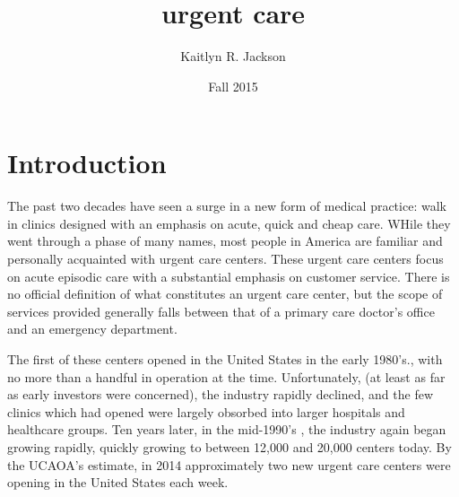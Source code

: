 \documentclass[12pt,twoside]{reedthesis}
\title{urgent care}
\author{Kaitlyn R. Jackson}
\date{Fall 2015}
\begin{document}
      \maketitle
  
  \frontmatter %
  \pagestyle{empty} %

  
  

      \hypersetup{linkcolor=black}
    \setcounter{tocdepth}{2}
    \tableofcontents
  
  
  
  
  
  \mainmatter %
  \pagestyle{fancyplain} %

  \chapter*{Introduction}\label{introduction}
  
  \doublespacing
  
  The past two decades have seen a surge in a new form of medical
  practice: walk in clinics designed with an emphasis on acute, quick and
  cheap care. WHile they went through a phase of many names, most people
  in America are familiar and personally acquainted with urgent care
  centers. These urgent care centers focus on acute episodic care with a
  substantial emphasis on customer service. There is no official
  definition of what constitutes an urgent care center, but the scope of
  services provided generally falls between that of a primary care
  doctor's office and an emergency department.
  
  The first of these centers opened in the United States in the early
  1980's., with no more than a handful in operation at the time.
  Unfortunately, (at least as far as early investors were concerned), the
  industry rapidly declined, and the few clinics which had opened were
  largely obsorbed into larger hospitals and healthcare groups. Ten years
  later, in the mid-1990's , the industry again began growing rapidly,
  quickly growing to between 12,000 and 20,000 centers today. By the
  UCAOA's estimate, in 2014 approximately two new urgent care centers were
  opening in the United States each week.
  
\end{document}
